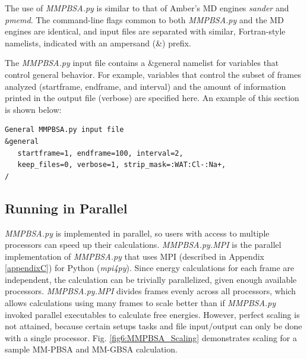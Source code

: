 The use of \emph{MMPBSA.py} is similar to that of Amber's MD engines
\emph{sander} and \emph{pmemd}. The command-line flags common to both
\emph{MMPBSA.py} and the MD engines are identical, and input files are separated
with similar, Fortran-style namelists, indicated with an ampersand (&) prefix.

The \emph{MMPBSA.py} input file contains a &general namelist for variables that
control general behavior. For example, variables that control the subset of
frames analyzed (startframe, endframe, and interval) and the amount of
information printed in the output file (verbose) are specified here. An example
of this section is shown below:
\begin{verbatim}
General MMPBSA.py input file
&general
   startframe=1, endframe=100, interval=2,
   keep_files=0, verbose=1, strip_mask=:WAT:Cl-:Na+,
/
\end{verbatim}

\subsection{Running in Parallel}

\emph{MMPBSA.py} is implemented in parallel, so users with access to multiple
processors can speed up their calculations. \emph{MMPBSA.py.MPI} is the parallel
implementation of \emph{MMPBSA.py} that uses MPI (described in Appendix
\ref{appendixC}) for Python (\emph{mpi4py}). Since energy calculations for each
frame are independent, the calculation can be trivially parallelized, given
enough available processors. \emph{MMPBSA.py.MPI} divides frames evenly across
all processors, which allows calculations using many frames to scale better than
if \emph{MMPBSA.py} invoked parallel executables to calculate free energies.
However, perfect scaling is not attained, because certain setups tasks and file
input/output can only be done with a single processor. Fig.
\ref{fig6:MMPBSA_Scaling} demonstrates scaling for a sample MM-PBSA and MM-GBSA
calculation.

